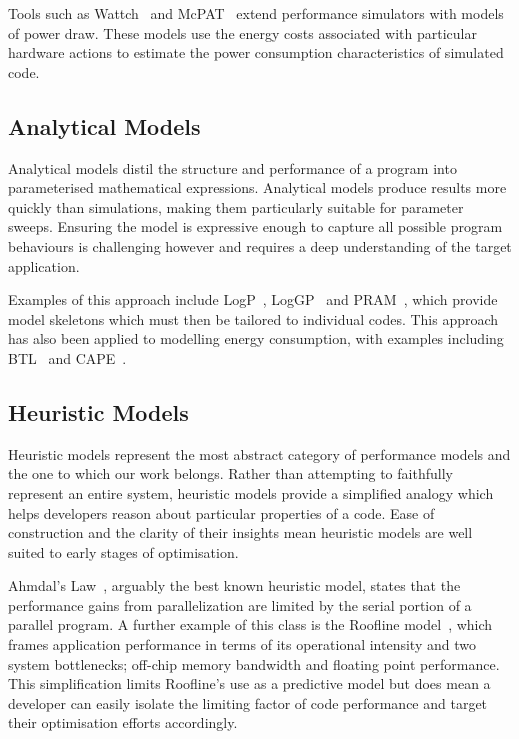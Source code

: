 Tools such as Wattch~\cite{brooks:2000aa} and McPAT~\cite{li:2009aa} extend performance simulators with models of power draw.
These models use the energy costs associated with particular hardware actions to estimate the power consumption characteristics of simulated code.

\subsection{Analytical Models} 
Analytical models distil the structure and performance of a program into parameterised mathematical expressions.
Analytical models produce results more quickly than simulations, making them particularly suitable for parameter sweeps.
Ensuring the model is expressive enough to capture all possible program behaviours is challenging however and requires a deep understanding of the target application.

Examples of this approach include LogP~\cite{culler:1993aa}, LogGP~\cite{alexandrov:1997aa} and PRAM~\cite{karp:1991aa}, which provide model skeletons which must then be tailored to individual codes.
This approach has also been applied to modelling energy consumption, with examples including BTL~\cite{manousakis:2012aa} and CAPE~\cite{kamble:1997aa}.

\subsection{Heuristic Models}
Heuristic models represent the most abstract category of performance models and the one to which our work belongs.
Rather than attempting to faithfully represent an entire system, heuristic models provide a simplified analogy which helps developers reason about particular properties of a code.
Ease of construction and the clarity of their insights mean heuristic models are well suited to early stages of optimisation.

Ahmdal's Law~\cite{amdahl:1967aa}, arguably the best known heuristic model, states that the performance gains from parallelization are limited by the serial portion of a parallel program.
A further example of this class is the Roofline model~\cite{williams:2009aa}, which frames application performance in terms of its operational intensity and two system bottlenecks; off-chip memory bandwidth and floating point performance.
This simplification limits Roofline's use as a predictive model but does mean a developer can easily isolate the limiting factor of code performance and target their optimisation efforts accordingly.

